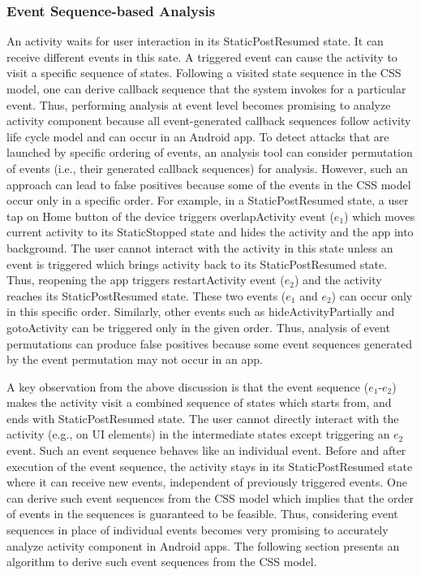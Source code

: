 \documentclass[10pt]{elsarticle}
\begin{document}
\subsubsection {Event Sequence-based Analysis} An activity waits for user interaction in its StaticPostResumed state. It can receive different events in this sate. A triggered event can cause the activity to visit a specific sequence of states. Following a visited state sequence in the CSS model, one can derive callback sequence that the system invokes for a particular event. Thus, performing analysis at event level becomes promising to analyze activity component because all event-generated callback sequences follow activity life cycle model and can occur in an Android app. To detect attacks that are launched by specific ordering of events, an analysis tool can consider permutation of events (i.e., their generated callback sequences) for analysis. However, such an approach can lead to false positives because some of the events in the CSS model occur only in a specific order. For example, in a StaticPostResumed state, a user tap on Home button of the device triggers overlapActivity event ($e_1$) which moves current activity to its StaticStopped state and hides the activity and the app into background. The user cannot interact with the activity in this state unless an event is triggered which brings activity back to its StaticPostResumed state. Thus, reopening the app triggers restartActivity event ($e_2$) and the activity reaches its StaticPostResumed state. These two events ($e_1$ and $e_2$) can occur only in this specific order. Similarly, other events such as hideActivityPartially and gotoActivity can be triggered only in the given order. Thus, analysis of event permutations can produce false positives because some event sequences generated by the event permutation may not occur in an app. 


A key observation from the above discussion is that the event sequence ($e_1$-$e_2$) makes the activity visit a combined sequence of states which starts from, and ends with StaticPostResumed state. The user cannot directly interact with the activity (e.g., on UI elements) in the intermediate states except triggering an $e_2$ event. Such an event sequence behaves like an individual event. Before and after execution of the event sequence, the activity stays in its StaticPostResumed state where it can receive new events, independent of previously triggered events. One can derive such event sequences from the CSS model which implies that the order of events in the sequences is guaranteed to be feasible. Thus, considering event sequences in place of individual events becomes very promising to accurately analyze activity component in Android apps. The following section presents an algorithm to derive such event sequences from the CSS model.  
\end{document}
